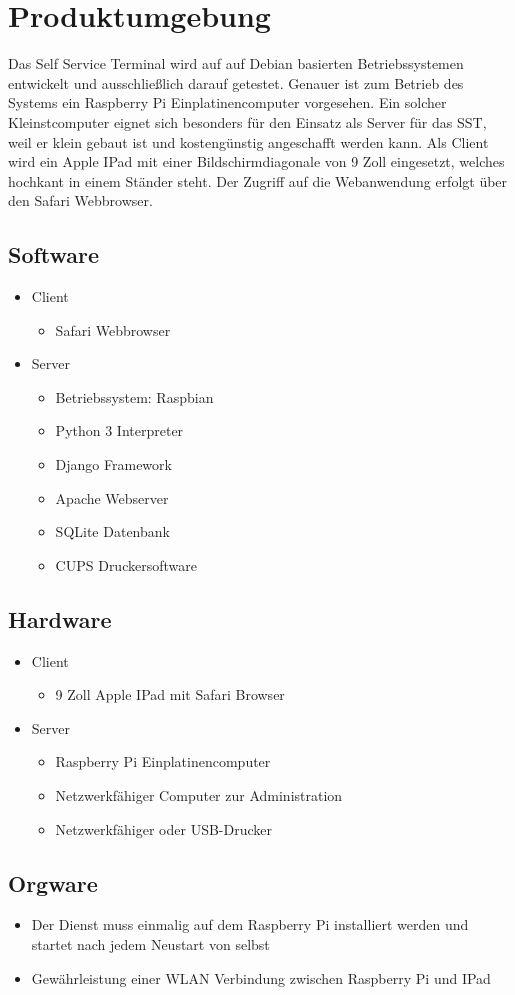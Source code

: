 \section{Produktumgebung}

Das Self Service Terminal wird auf auf Debian basierten Betriebssystemen entwickelt und ausschließlich darauf getestet. Genauer ist zum Betrieb des Systems ein Raspberry Pi Einplatinencomputer vorgesehen. Ein solcher Kleinstcomputer eignet sich besonders für den Einsatz als Server für das SST, weil er klein gebaut ist und kostengünstig angeschafft werden kann. Als Client wird ein Apple IPad mit einer Bildschirmdiagonale von 9 Zoll eingesetzt, welches hochkant in einem Ständer steht. Der Zugriff auf die Webanwendung erfolgt über den Safari Webbrowser.

\subsection{Software}

\begin{itemize}
  \item Client
    \begin{itemize}
      \item Safari Webbrowser
    \end{itemize}
  \item Server
    \begin{itemize}
      \item Betriebssystem: Raspbian
      \item Python 3 Interpreter
      \item Django Framework
      \item Apache Webserver
      \item SQLite Datenbank
      \item CUPS Druckersoftware
    \end{itemize}
\end{itemize}

\subsection{Hardware}


 \begin{itemize}
    \item Client
    \begin{itemize}
      \item 9 Zoll Apple IPad mit Safari Browser
    \end{itemize}
  \item Server
    \begin{itemize}
      \item Raspberry Pi Einplatinencomputer
      \item Netzwerkfähiger Computer zur Administration
      \item Netzwerkfähiger oder USB-Drucker
    \end{itemize}
\end{itemize}
\subsection{Orgware}

\begin{itemize}
  \item Der Dienst muss einmalig auf dem Raspberry Pi installiert werden und startet nach jedem Neustart von selbst
  \item Gewährleistung einer WLAN Verbindung zwischen Raspberry Pi und IPad
\end{itemize}
